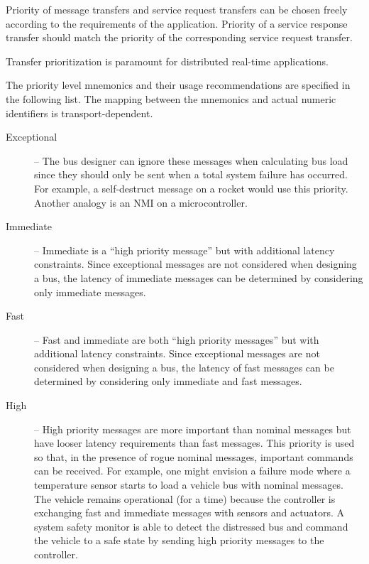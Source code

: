 Priority of message transfers and service request transfers can be chosen freely
according to the requirements of the application.
Priority of a service response transfer should match the priority of the corresponding service request transfer.

\begin{remark}[breakable]
    Transfer prioritization is paramount for distributed real-time applications.

    The priority level mnemonics and their usage recommendations are specified in the following list.
    The mapping between the mnemonics and actual numeric identifiers is transport-dependent.

    \begin{description}
        \item[Exceptional] -- The bus designer can ignore these messages when calculating bus load since they
        should only be sent when a total system failure has occurred.
        For example, a self-destruct message on a rocket would use this priority.
        Another analogy is an NMI on a microcontroller.

        \item[Immediate] -- Immediate is a ``high priority message'' but with additional latency constraints.
        Since exceptional messages are not considered when designing a bus, the latency of immediate messages
        can be determined by considering only immediate messages.

        \item[Fast] -- Fast and immediate are both ``high priority messages'' but with additional latency constraints.
        Since exceptional messages are not considered when designing a bus,
        the latency of fast messages can be determined by considering only immediate and fast messages.

        \item[High] -- High priority messages are more important than nominal messages but have looser
        latency requirements than fast messages. This priority is used so that,
        in the presence of rogue nominal messages, important commands can be received.
        For example, one might envision a failure mode where a temperature sensor starts to
        load a vehicle bus with nominal messages.
        The vehicle remains operational (for a time) because the controller is exchanging fast and
        immediate messages with sensors and actuators.
        A system safety monitor is able to detect the distressed bus and command the vehicle to a
        safe state by sending high priority messages to the controller.


\end{description}
\end{remark}
